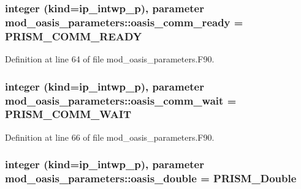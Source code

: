 \hypertarget{classmod__oasis__parameters_a8484e196ef7469adbeaef850787d7502}{
\subsubsection[{oasis\+\_\+comm\+\_\+ready}]{\setlength{\rightskip}{0pt plus 5cm}integer (kind=ip\+\_\+intwp\+\_\+p), parameter mod\+\_\+oasis\+\_\+parameters\+::oasis\+\_\+comm\+\_\+ready = P\+R\+I\+S\+M\+\_\+\+C\+O\+M\+M\+\_\+\+R\+E\+A\+D\+Y}}\label{classmod__oasis__parameters_a8484e196ef7469adbeaef850787d7502}


Definition at line 64 of file mod\+\_\+oasis\+\_\+parameters.\+F90.

\hypertarget{classmod__oasis__parameters_a9df795bd9123857642aae31661b6c13a}{
\subsubsection[{oasis\+\_\+comm\+\_\+wait}]{\setlength{\rightskip}{0pt plus 5cm}integer (kind=ip\+\_\+intwp\+\_\+p), parameter mod\+\_\+oasis\+\_\+parameters\+::oasis\+\_\+comm\+\_\+wait = P\+R\+I\+S\+M\+\_\+\+C\+O\+M\+M\+\_\+\+W\+A\+I\+T}}\label{classmod__oasis__parameters_a9df795bd9123857642aae31661b6c13a}


Definition at line 66 of file mod\+\_\+oasis\+\_\+parameters.\+F90.

\hypertarget{classmod__oasis__parameters_a1071adbbf4c378907b4ff69dd53d0d7e}{
\subsubsection[{oasis\+\_\+double}]{\setlength{\rightskip}{0pt plus 5cm}integer (kind=ip\+\_\+intwp\+\_\+p), parameter mod\+\_\+oasis\+\_\+parameters\+::oasis\+\_\+double = P\+R\+I\+S\+M\+\_\+\+Double}}\label{classmod__oasis__parameters_a1071adbbf4c378907b4ff69dd53d0d7e}


